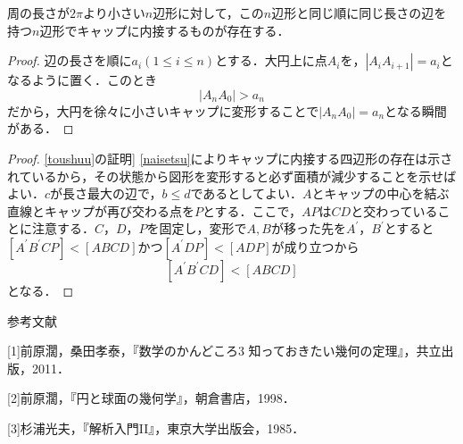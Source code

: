 \documentclass[uplatex]{jsarticle}
\begin{document}
\begin{lemma}\label{naisetsu}周の長さが$2\pi$より小さい$n$辺形に対して，この$n$辺形と同じ順に同じ長さの辺を持つ$n$辺形でキャップに内接するものが存在する．\end{lemma}
\begin{proof}
辺の長さを順に$a_i(1\le i\le n)$とする．大円上に点$A_i$を，$|A_iA_{i+1}|=a_i$となるように置く．このとき
\[ |A_nA_0|>a_n \]
だから，大円を徐々に小さいキャップに変形することで$|A_nA_0|=a_n$となる瞬間がある．
\end{proof}


\vspace{5 ex}
\begin{proof}\cref{toushuu}の証明] \cref{naisetsu}によりキャップに内接する四辺形の存在は示されているから，その状態から図形を変形すると必ず面積が減少することを示せばよい．$c$が長さ最大の辺で，$b\le d$であるとしてよい．$A$とキャップの中心を結ぶ直線とキャップが再び交わる点を$P$とする．ここで，$AP$は$CD$と交わっていることに注意する．$C，D，P$を固定し，変形で$A,B$が移った先を$A^{\prime}，B^{\prime}$とすると$[A^{\prime}B^{\prime}CP]<[ABCD]$かつ$[A^{\prime}DP]<[ADP]$が成り立つから
\[ [A^{\prime}B^{\prime}CD]<[ABCD] \]
となる．\end{proof}
\begin{center}

\end{center}

\vspace{10 ex}
\noindent 参考文献

[1]前原濶，桑田孝泰，『数学のかんどころ3 知っておきたい幾何の定理』，共立出版，2011．

[2]前原濶，『円と球面の幾何学』，朝倉書店，1998．

[3]杉浦光夫，『解析入門II』，東京大学出版会，1985．
\end{document}
